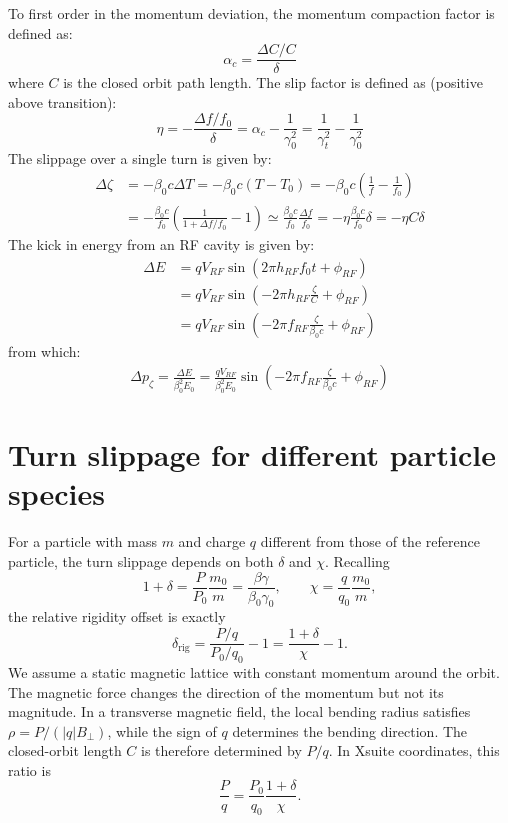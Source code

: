 To first order in the momentum deviation, the momentum compaction factor is defined as:
\begin{equation}
\alpha_c =
\frac{\Delta C/C}\delta
\end{equation}
%
where $C$ is the closed orbit path length.
The slip factor is defined as (positive above transition):
\begin{equation}
\eta = -\frac{\Delta f/f_0}{\delta} = \alpha_c - \frac{1}{\gamma_0^2}
= \frac{1}{\gamma_t^2}- \frac{1}{\gamma_0^2}
\end{equation}
%
The slippage over a single turn is given by:
\begin{align}
\Delta \zeta
& = -\beta_0 c \Delta T
= -\beta_0 c (T - T_0)
= -\beta_0 c \left(\frac{1}{f} - \frac{1}{f_0}\right) \\
&= -\frac{\beta_0 c}{f_0} \left(\frac{1}{1 + {\Delta f}/{f_0}} - 1\right)
\simeq \frac{\beta_0 c}{f_0}\frac{\Delta f}{f_0}
= -\eta \frac{\beta_0 c}{f_0}\delta
= -\eta C \delta
\end{align}
%
The kick in energy from an RF cavity is given by:
\begin{align}
\Delta E
& = q V_{RF} \sin\left( 2 \pi h_{RF} f_0 t + \phi_{RF} \right)\\
& = q V_{RF} \sin\left(-2 \pi h_{RF} \frac{\zeta}{C} + \phi_{RF} \right)\\
& = q V_{RF} \sin\left(-2 \pi f_{RF} \frac{\zeta}{\beta_0 c} + \phi_{RF} \right)
\end{align}
from which:
\begin{align}
\Delta p_\zeta = \frac{\Delta E}{\beta_0^2E_0}
= \frac{q V_{RF}}{\beta_0^2E_0}\sin\left(-2 \pi f_{RF} \frac{\zeta}{\beta_0 c} + \phi_{RF}\right)
\end{align}

\section{Turn slippage for different particle species}
\label{sec:synchrotron_different_species}

For a particle with mass $m$ and charge $q$ different from those of the reference
particle, the turn slippage depends on both $\delta$ and $\chi$. Recalling
\begin{equation}
1+\delta=\frac{P}{P_0}\frac{m_0}{m}
=\frac{\beta\gamma}{\beta_0\gamma_0},
\qquad
\chi=\frac{q}{q_0}\frac{m_0}{m},
\end{equation}
the relative rigidity offset is exactly
\begin{equation}
\delta_{\mathrm{rig}}
=\frac{P/q}{P_0/q_0}-1
=\frac{1+\delta}{\chi}-1.
\label{eq:species_rigidity_offset}
\end{equation}
We assume a static magnetic lattice with constant momentum around the orbit.
The magnetic force changes the direction of the momentum but not its magnitude.
In a transverse magnetic field, the local bending radius satisfies
$\rho=P/(|q|B_\perp)$, while the sign of $q$ determines the bending direction.
The closed-orbit length $C$ is therefore determined by
$P/q$. In Xsuite coordinates, this ratio is
\begin{equation*}
\frac{P}{q}=\frac{P_0}{q_0}\frac{1+\delta}{\chi}.
\end{equation*}

